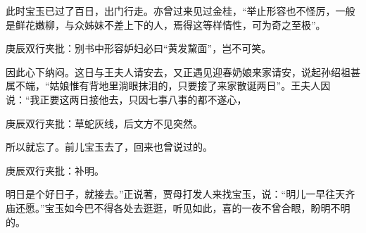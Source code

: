 \begin{parag}
    此时宝玉已过了百日，出门行走。亦曾过来见过金桂，“举止形容也不怪厉，一般是鲜花嫩柳，与众姊妹不差上下的人，焉得这等样情性，可为奇之至极”。\begin{note}庚辰双行夹批：别书中形容妒妇必曰“黄发黧面”，岂不可笑。\end{note}因此心下纳闷。这日与王夫人请安去，又正遇见迎春奶娘来家请安，说起孙绍祖甚属不端，“姑娘惟有背地里淌眼抹泪的，只要接了来家散诞两日”。王夫人因说：“我正要这两日接他去，只因七事八事的都不遂心，\begin{note}庚辰双行夹批：草蛇灰线，后文方不见突然。\end{note}所以就忘了。前儿宝玉去了，回来也曾说过的。\begin{note}庚辰双行夹批：补明。\end{note}明日是个好日子，就接去。”正说著，贾母打发人来找宝玉，说：“明儿一早往天齐庙还愿。”宝玉如今巴不得各处去逛逛，听见如此，喜的一夜不曾合眼，盼明不明的。
\end{parag}



